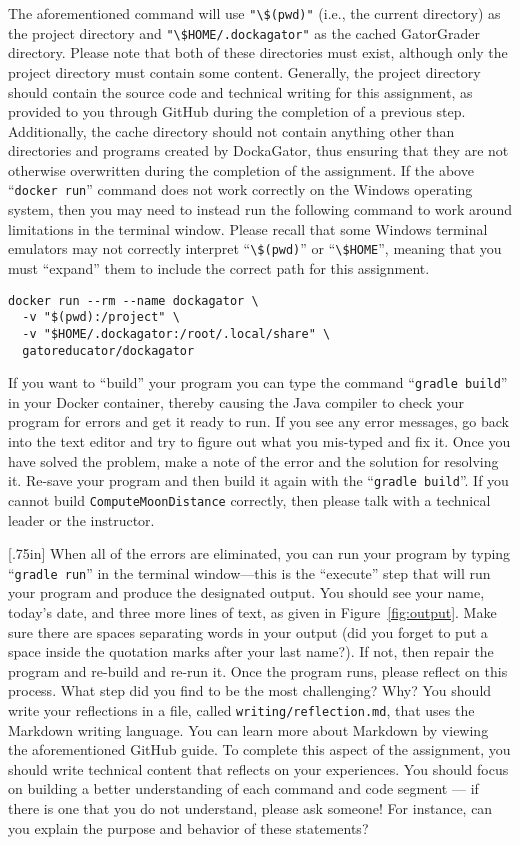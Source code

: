 \documentclass[11pt]{article}
\newcommand{\mainprogram}{\lstinline{ComputeMoonDistance}}
\newcommand{\reflection}{\lstinline{writing/reflection.md}}
\newcommand{\gradlebuild}{\command{gradle build}}
\newcommand{\gradlerun}{\command{gradle run}}
\newcommand{\command}[1]{``\lstinline{#1}''}
\newcommand{\program}[1]{\lstinline{#1}}
\newcommand{\step}[1]{``{#1}''}
\newcommand{\think}[1]{\null\hfill\LARGE{\faCogs{}}\newline\scriptsize{\em{#1}}}
\begin{document}
The aforementioned command will use \program{"\$(pwd)"} (i.e., the current
directory) as the project directory and \program{"\$HOME/.dockagator"} as the
cached GatorGrader directory. Please note that both of these directories must
exist, although only the project directory must contain some content. Generally,
the project directory should contain the source code and technical writing for
this assignment, as provided to you through GitHub during the completion of a
previous step. Additionally, the cache directory should not contain anything
other than directories and programs created by DockaGator, thus ensuring that
they are not otherwise overwritten during the completion of the assignment. If
the above \command{docker run} command does not work correctly on the Windows
operating system, then you may need to instead run the following command to work
around limitations in the terminal window. Please recall that some Windows
terminal emulators may not correctly interpret \command{\$(pwd)} or
\command{\$HOME}, meaning that you must ``expand'' them to include the correct
path for this assignment.

\begin{verbatim}
docker run --rm --name dockagator \
  -v "$(pwd):/project" \
  -v "$HOME/.dockagator:/root/.local/share" \
  gatoreducator/dockagator
\end{verbatim}

If you want to \step{build} your program you can type the command \gradlebuild{}
in your Docker container, thereby causing the Java compiler to check your
program for errors and get it ready to run. If you see any error messages, go
back into the text editor and try to figure out what you mis-typed and fix it.
Once you have solved the problem, make a note of the error and the solution for
resolving it. Re-save your program and then build it again with the
\gradlebuild{}. If you cannot build \mainprogram{} correctly, then please talk
with a technical leader or the instructor.

\marginnote{\think{Reflect on challenges}}[.75in] When all of the errors are
eliminated, you can run your program by typing \gradlerun{} in the terminal
window---this is the ``execute'' step that will run your program and produce the
designated output. You should see your name, today's date, and three more lines
of text, as given in Figure~\ref{fig:output}. Make sure there are spaces
separating words in your output (did you forget to put a space inside the
quotation marks after your last name?). If not, then repair the program and
re-build and re-run it. Once the program runs, please reflect on this process.
What step did you find to be the most challenging? Why? You should write your
reflections in a file, called \reflection{}, that uses the Markdown writing
language. You can learn more about Markdown by viewing the aforementioned GitHub
guide. To complete this aspect of the assignment, you should write technical
content that reflects on your experiences. You should focus on building a better
understanding of each command and code segment --- if there is one that you do
not understand, please ask someone! For instance, can you explain the purpose
and behavior of these statements?
\end{document}
